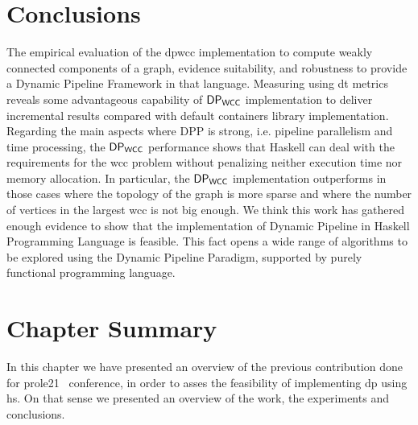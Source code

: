 \section{Conclusions}
The empirical evaluation of the \acrshort{dpwcc} implementation to compute weakly connected components of a graph, evidence suitability, 
and robustness to provide a Dynamic Pipeline Framework in that language. Measuring  using \acrshort{dt} metrics 
reveals some advantageous capability of $\mathsf{DP_{WCC}}$ implementation to deliver incremental results compared with default containers library implementation. 
Regarding the main aspects where DPP is strong, i.e. pipeline parallelism and time processing, the $\mathsf{DP_{WCC}}$ performance shows that Haskell 
can deal with the requirements for the \acrshort{wcc} problem without penalizing neither execution time nor memory allocation. 
In particular, the $\mathsf{DP_{WCC}}$ implementation outperforms in those cases where the topology of the graph is more sparse and where the number of 
vertices in the largest \acrshort{wcc} is not big enough. We think this work has gathered enough evidence to show that the implementation 
of Dynamic Pipeline in Haskell Programming Language is feasible. This fact opens a wide range of algorithms to be explored using the 
Dynamic Pipeline Paradigm, supported by purely functional programming language.

\section{Chapter Summary}
In this chapter we have presented an overview of the previous contribution done for \acrshort{prole21}~\cite{prole21} conference, in order to asses the 
feasibility of implementing \acrshort{dp} using \acrshort{hs}. On that sense we presented an overview of the work, the experiments and conclusions.

